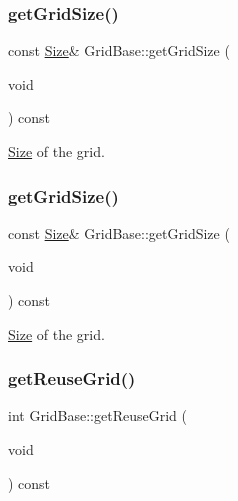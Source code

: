 \subsubsection{\texorpdfstring{get\+Grid\+Size()}{getGridSize()}\hspace{0.1cm}{\footnotesize\ttfamily [1/2]}}
{\footnotesize\ttfamily const \hyperlink{classSize}{Size}\& Grid\+Base\+::get\+Grid\+Size (\begin{DoxyParamCaption}\item[{void}]{ }\end{DoxyParamCaption}) const\hspace{0.3cm}{\ttfamily [inline]}}

\hyperlink{classSize}{Size} of the grid. \mbox{\label{classGridBase_a4c9abc11e4535202a109b347c523c637}} 
\subsubsection{\texorpdfstring{get\+Grid\+Size()}{getGridSize()}\hspace{0.1cm}{\footnotesize\ttfamily [2/2]}}
{\footnotesize\ttfamily const \hyperlink{classSize}{Size}\& Grid\+Base\+::get\+Grid\+Size (\begin{DoxyParamCaption}\item[{void}]{ }\end{DoxyParamCaption}) const\hspace{0.3cm}{\ttfamily [inline]}}

\hyperlink{classSize}{Size} of the grid. \mbox{\label{classGridBase_a09c05211ce92c3a6c8bf5a0898b2cc35}} 
\subsubsection{\texorpdfstring{get\+Reuse\+Grid()}{getReuseGrid()}\hspace{0.1cm}{\footnotesize\ttfamily [1/2]}}
{\footnotesize\ttfamily int Grid\+Base\+::get\+Reuse\+Grid (\begin{DoxyParamCaption}\item[{void}]{ }\end{DoxyParamCaption}) const\hspace{0.3cm}{\ttfamily [inline]}}

